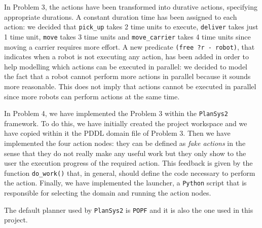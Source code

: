 In Problem 3, the actions have been transformed into durative actions, specifying appropriate durations.
A constant duration time has been assigned to each action: we decided that \texttt{pick\_up} takes 2 time 
units to execute, \texttt{deliver} takes just 1 time unit, \texttt{move} takes 3 time units and 
\texttt{move\_carrier} takes 4 time units since moving a carrier requires more effort.
A new predicate \texttt{(free ?r - robot)}, that indicates when a robot is not executing any action,
has been added in order to help modelling which actions can be executed in parallel: we decided to model the 
fact that a robot cannot perform more actions in parallel because it sounds more reasonable.
This does not imply that actions cannot be executed in parallel since more robots can perform
actions at the same time.

In Problem 4, we have implemented the Problem 3 within the \texttt{PlanSys2} framework.
To do this, we have initially created the project workspace and we have copied within it the PDDL domain 
file of Problem 3.
Then we have implemented the four action nodes: they can be defined as \textit{fake actions} in the sense 
that they do not really make any useful work but they only show to the user the execution progress of the 
required action. This feedback is given by the function \texttt{do\_work()} that, in
general, should define the code necessary to perform the action.
Finally, we have implemented the launcher, a \texttt{Python} script that is responsible for selecting the
domain and running the action nodes.

The default planner used by \texttt{PlanSys2} is \texttt{POPF} and it is also the one used in this project.

